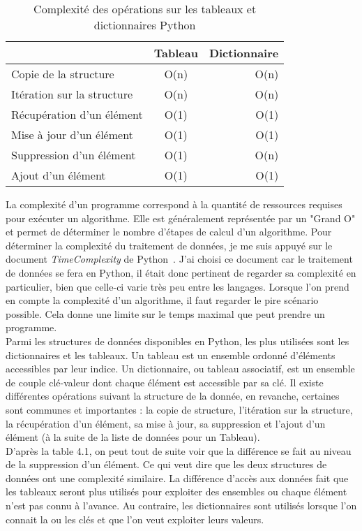 \begin{table}[H]
\begin{center}
\begin{tabular}{ | l | c | r | }
\hline
 & Tableau & Dictionnaire \\
 \hline
Copie de la structure & O(n) & O(n) \\
Itération sur la structure & O(n) & O(n) \\
Récupération d'un élément & O(1) & O(1) \\
Mise à jour d'un élément & O(1) & O(1) \\
Suppression d'un élément & O(1) & O(n) \\
Ajout d'un élément & O(1) & O(1) \\
\hline
\end{tabular}
\caption{Complexité des opérations sur les tableaux et dictionnaires Python}
\end{center}
\end{table}


La complexité d'un programme correspond à la quantité de ressources requises pour exécuter un algorithme. Elle est généralement représentée par un "Grand O" et permet de déterminer le nombre d'étapes de calcul d'un algorithme. Pour déterminer la complexité du traitement de données, je me suis appuyé sur le document \textit{TimeComplexity} de Python~\cite{TimeComplexity}. J'ai choisi ce document car le traitement de données se fera en Python, il était donc pertinent de regarder sa complexité en particulier, bien que celle-ci varie très peu entre les langages. Lorsque l'on prend en compte la complexité d'un algorithme, il faut regarder le pire scénario possible. Cela donne une limite sur le temps maximal que peut prendre un programme.\\

Parmi les structures de données disponibles en Python, les plus utilisées sont les dictionnaires et les tableaux. Un tableau est un ensemble ordonné d'éléments accessibles par leur indice. Un dictionnaire, ou tableau associatif, est un ensemble de couple clé-valeur dont chaque élément est accessible par sa clé. Il existe différentes opérations suivant la structure de la donnée, en revanche, certaines sont communes et importantes : la copie de structure, l'itération sur la structure, la récupération d'un élément, sa mise à jour, sa suppression et l'ajout d'un élément (à la suite de la liste de données pour un Tableau).\\

D'après la table 4.1, on peut tout de suite voir que la différence se fait au niveau de la suppression d'un élément. Ce qui veut dire que les deux structures de données ont une complexité similaire. La différence d'accès aux données fait que les tableaux seront plus utilisés pour exploiter des ensembles ou chaque élément n'est pas connu à l'avance. Au contraire, les dictionnaires sont utilisés lorsque l'on connait la ou les clés et que l'on veut exploiter leurs valeurs.